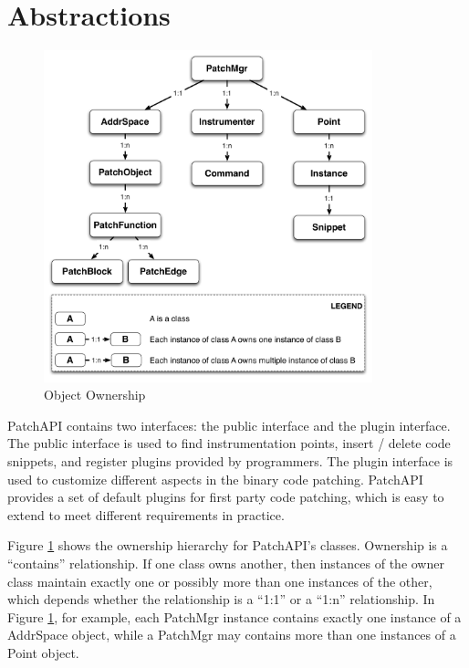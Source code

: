 \section{Abstractions}
\label{sec-2}

\begin{figure}[htb]
\centerline{\includegraphics[width=0.85\textwidth]{./figure/abstraction/img.pdf}}
\caption{\label{fig:abs}Object Ownership}
\end{figure}


PatchAPI contains two interfaces: the public interface and the plugin interface.
The public interface is used to find instrumentation points, insert / delete
code snippets, and register plugins provided by programmers. The plugin
interface is used to customize different aspects in the binary code patching.
PatchAPI provides a set of default plugins for first party code patching, which
is easy to extend to meet different requirements in practice.

Figure \ref{fig:abs} shows the ownership hierarchy for PatchAPI's classes.
Ownership is a ``contains'' relationship. If one class owns another, then
instances of the owner class maintain exactly one or possibly more than one
instances of the other, which depends whether the relationship is a ``1:1'' or a
``1:n'' relationship. In Figure \ref{fig:abs}, for example, each PatchMgr instance
contains exactly one instance of a AddrSpace object, while a PatchMgr may
contains more than one instances of a Point object.

